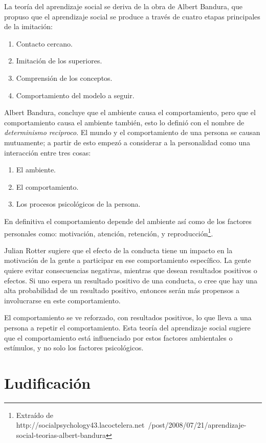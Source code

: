 La teoría del aprendizaje social se deriva de la obra de Albert Bandura, que
propuso que el aprendizaje social se produce a través de cuatro etapas
principales de la imitación:

\begin{enumerate}
\item Contacto cercano.
\item Imitación de los superiores.
\item Comprensión de los conceptos.
\item Comportamiento del modelo a seguir.
\end{enumerate}

Albert Bandura, concluye que el ambiente causa el comportamiento, pero que el
comportamiento causa el ambiente también, esto lo definió con el nombre de
\emph{determinismo reciproco}. El mundo y el comportamiento de una persona se
causan mutuamente; a partir de esto empezó a considerar a la personalidad como
una interacción entre tres cosas:

\begin{enumerate}
\item El ambiente.
\item El comportamiento.
\item Los procesos psicológicos de la persona.
\end{enumerate}

En definitiva el comportamiento depende del ambiente así como de los factores
personales como: motivación, atención, retención, y
reproducción\footnote{Extraído de http://socialpsychology43.lacoctelera.net\
/post/2008/07/21/aprendizaje-social-teorias-albert-bandura}.

Julian Rotter sugiere que el efecto de la conducta tiene un impacto en la
motivación de la gente a participar en ese comportamiento específico. La gente
quiere evitar consecuencias negativas, mientras que desean resultados positivos
o efectos. Si uno espera un resultado positivo de una conducta, o cree que hay
una alta probabilidad de un resultado positivo, entonces serán más propensos a
involucrarse en este comportamiento.

El comportamiento se ve reforzado, con resultados positivos, lo que lleva a una
persona a repetir el comportamiento. Esta teoría del aprendizaje social sugiere
que el comportamiento está influenciado por estos factores ambientales o
estímulos, y no solo los factores psicológicos.

\section{Ludificación}

